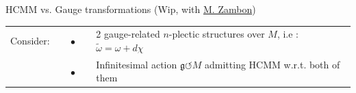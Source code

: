 \documentclass[final,a0paper,20pt,
						pdftex,
            pdfauthor={Antonio Michele Miti},
            pdftitle={Homotopy title},
            pdfsubject={Poster for the conference Super19 in Luxembourg},
            pdfkeywords={Some Keywords},
            pdfproducer={Latex with hyperref, or other system},
            pdfcreator={pdflatex, or other tool}
            ]{beamer}
\newcommand{\pinned}[1]{
    \faThumbTack 
    \hfill
    #1
    \hfill \faThumbTack
    \\
    }
\begin{document}
\begin{frame}[t]
\begin{columns}[t]
\begin{column}{\onecolwid}
	\begin{block}{\pinned{HCMM vs. Gauge transformations
		{\small(Wip, with \href{https://perswww.kuleuven.be/~u0096206/}{M. Zambon})
		}}}
		\vspace{-0.4em}
		\begin{tabular}{lll}
			\quad Consider: 
			&$\quad\bullet\quad$
			& 2 gauge-related $n$-plectic structures over $M$, i.e : 
				~$ \tilde{\omega} = \omega + d \chi $
			\\
			&$\quad\bullet\quad$ 
			& Infinitesimal action $\mathfrak{g} \circlearrowleft M $ admitting HCMM w.r.t. both of them
		\end{tabular} 

		\begin{center}
			
		\end{center}	
	

\end{block}
\end{column}
\end{columns}
\end{frame}
\end{document}

